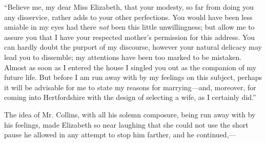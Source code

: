 \documentclass[12pt]{book}
\begin{document}
``Believe me, my dear Miss Elizabeth, that your modesty, so far from doing you any disservice, rather adds to your other perfections. You would have been less amiable in my eyes had there \textit{not} been this little unwillingness; but allow me to assure you that I have your respected mother's permission for this address. You can hardly doubt the purport of my discourse, however your natural delicacy may lead you to dissemble; my attentions have been too marked to be mistaken. Almost as soon as I entered the house I singled you out as the companion of my future life. But before I am run away with by my feelings on this subject, perhaps it will be advisable for me to state my reasons for marrying---and, moreover, for coming into Hertfordshire with the design of selecting a wife, as I certainly did.''

The idea of Mr. Collins, with all his solemn composure, being run away with by his feelings, made Elizabeth so near laughing that she could not use the short pause he allowed in any attempt to stop him farther, and he continued,---
\end{document}
